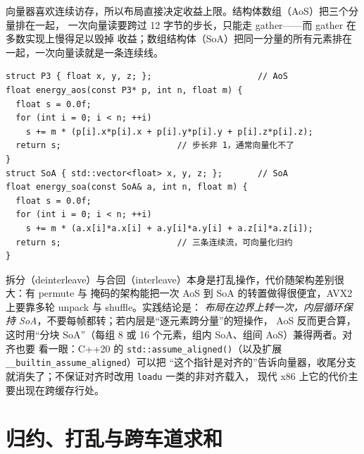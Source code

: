 \documentclass[12pt,a4paper,fontset=fandol]{ctexbook}
\newcommand{\cpp}[1]{C++#1}
\newcommand{\Fn}[1]{\texttt{#1()}}
\newcommand{\Tp}[1]{\texttt{#1}}
\begin{document}
向量器喜欢连续访存，所以布局直接决定收益上限。结构体数组（AoS）把三个分量排在一起，
一次向量读要跨过 12 字节的步长，只能走 gather——而 gather 在多数实现上慢得足以毁掉
收益；数组结构体（SoA）把同一分量的所有元素排在一起，一次向量读就是一条连续线。
\begin{lstlisting}[style=cppstyle,caption={同一段物理：AoS 与 SoA 的向量化差别}]
struct P3 { float x, y, z; };                     // AoS
float energy_aos(const P3* p, int n, float m) {
  float s = 0.0f;
  for (int i = 0; i < n; ++i)
    s += m * (p[i].x*p[i].x + p[i].y*p[i].y + p[i].z*p[i].z);
  return s;                       // 步长非 1，通常向量化不了
}
struct SoA { std::vector<float> x, y, z; };       // SoA
float energy_soa(const SoA& a, int n, float m) {
  float s = 0.0f;
  for (int i = 0; i < n; ++i)
    s += m * (a.x[i]*a.x[i] + a.y[i]*a.y[i] + a.z[i]*a.z[i]);
  return s;                       // 三条连续流，可向量化归约
}
\end{lstlisting}
拆分（deinterleave）与合回（interleave）本身是打乱操作，代价随架构差别很大：有 permute 与
掩码的架构能把一次 AoS 到 SoA 的转置做得很便宜，AVX2 上要靠多轮 unpack 与 shuffle。实践结论是：
\emph{布局在边界上转一次，内层循环保持 SoA}，不要每帧都转；若内层是``逐元素跨分量''的短操作，
AoS 反而更合算，这时用``分块 SoA''（每组 8 或 16 个元素，组内 SoA、组间 AoS）兼得两者。对齐也要
看一眼：\cpp{20} 的 \Fn{std::assume\_aligned}（以及扩展 \Tp{\_\_builtin\_assume\_aligned}）可以把
``这个指针是对齐的''告诉向量器，收尾分支就消失了；不保证对齐时改用 \Tp{loadu} 一类的非对齐载入，
现代 x86 上它的代价主要出现在跨缓存行处。

\section{归约、打乱与跨车道求和}
\end{document}
